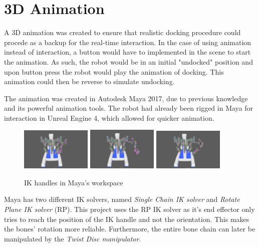 \section*{3D Animation}
A 3D animation was created to ensure that realistic docking procedure could procede as a backup for the real-time interaction. In the case of using animation instead of interaction, a button would have to implemented in the scene to start the animation. As such, the robot would be in an initial "undocked" position and upon button press the robot would play the animation of docking. This animation could then be reverse to simulate undocking.

The animation was created in Autodesk Maya 2017, due to previous knowledge and its powerful animation tools. The robot had already been rigged in Maya for interaction in Unreal Engine 4, which allowed for quicker animation.

\begin{figure}[hpbt]
	\centering
	\includegraphics[width=0.3\textwidth]{ModelAnim/IK1}
	\includegraphics[width=0.3\textwidth]{ModelAnim/IK2}
	\includegraphics[width=0.3\textwidth]{ModelAnim/IK3}
	\caption{IK handles in Maya's workspace}
\end{figure}

Maya has two different IK solvers, named \textit{Single Chain IK solver} and \textit{Rotate Plane IK solver} (RP). This project uses the RP IK solver as it's end effector only tries to reach the position of the IK handle and not the orientation. This makes the bones' rotation more reliable. Furthermore, the entire bone chain can later be manipulated by the \textit{Twist Disc manipulator}.